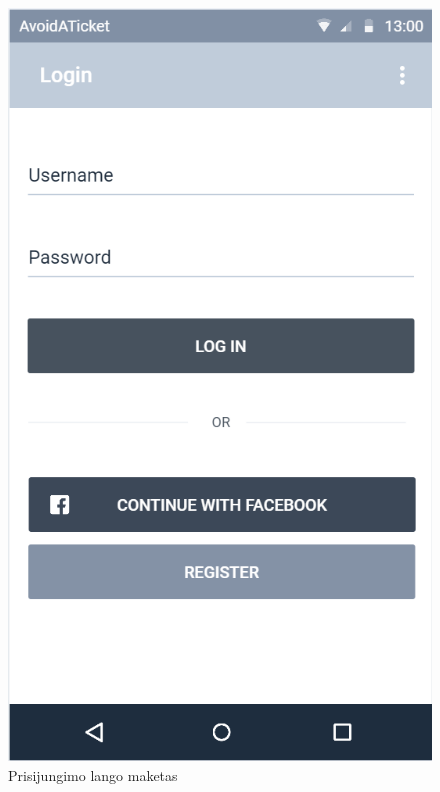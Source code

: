 \documentclass{VUMIFPSkursinis}
\begin{document}
	\begin{figure}[H]
				\centering
				\includegraphics[scale=0.3]{img/mockup_login}
				\caption{Prisijungimo lango maketas}
				\label{img:prisijungimas}
			\end{figure}
\end{document}
